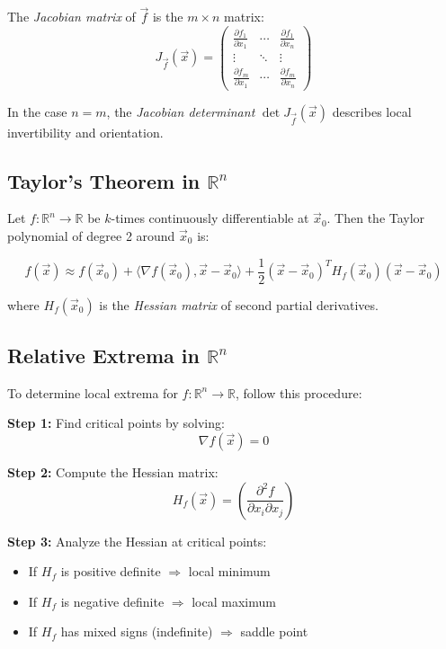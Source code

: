 The \emph{Jacobian matrix} of \( \vec{f} \) is the \( m \times n \) matrix:
\[
J_{\vec{f}}(\vec{x}) = \begin{pmatrix}
\frac{\partial f_1}{\partial x_1} & \cdots & \frac{\partial f_1}{\partial x_n} \\
\vdots & \ddots & \vdots \\
\frac{\partial f_m}{\partial x_1} & \cdots & \frac{\partial f_m}{\partial x_n}
\end{pmatrix}
\]

In the case \( n = m \), the \emph{Jacobian determinant} \( \det J_{\vec{f}}(\vec{x}) \) 
describes local invertibility and orientation.


\subsection{Taylor's Theorem in \( \mathbb{R}^n \)}

Let \( f : \mathbb{R}^n \to \mathbb{R} \) be \( k \)-times continuously differentiable at \( \vec{x}_0 \). Then the Taylor polynomial of degree 2 around \( \vec{x}_0 \) is:

\[
f(\vec{x}) \approx f(\vec{x}_0) + \langle \nabla f(\vec{x}_0), \vec{x} - \vec{x}_0 \rangle + \frac{1}{2} (\vec{x} - \vec{x}_0)^T H_f(\vec{x}_0)(\vec{x} - \vec{x}_0)
\]

where \( H_f(\vec{x}_0) \) is the \emph{Hessian matrix} of second partial derivatives.


\subsection{Relative Extrema in \( \mathbb{R}^n \)}

To determine local extrema for \( f : \mathbb{R}^n \to \mathbb{R} \), follow this procedure:

\textbf{Step 1:} Find critical points by solving:
\[
\nabla f(\vec{x}) = 0
\]

\textbf{Step 2:} Compute the Hessian matrix:
\[
H_f(\vec{x}) = \left( \frac{\partial^2 f}{\partial x_i \partial x_j} \right)
\]

\textbf{Step 3:} Analyze the Hessian at critical points:
\begin{itemize}[label=\(-\)]
\item If \( H_f \) is positive definite \( \Rightarrow \) local minimum
\item If \( H_f \) is negative definite \( \Rightarrow \) local maximum
\item If \( H_f \) has mixed signs (indefinite) \( \Rightarrow \) saddle point
\end{itemize}

